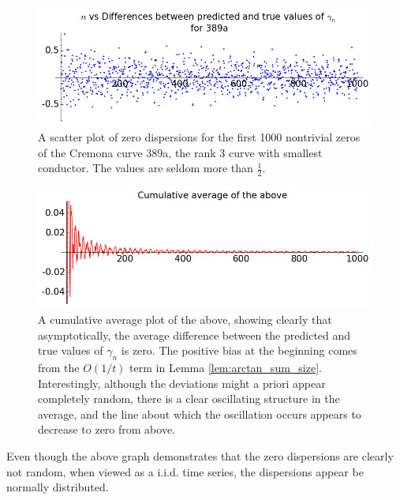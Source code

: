 \documentclass[10pt]{article}
\begin{document}
\begin{figure}[!h]
    \centering
    \includegraphics[width=1.0\textwidth]{graphics/389a_zero_dispersions_scatterplot.png}
    \caption{A scatter plot of zero dispersions for the first 1000 nontrivial zeros of the Cremona curve 389a, the rank 3 curve with smallest conductor. The values are seldom more than $\frac{1}{2}$.}
    \label{fig:389a_zero_dispersions_scatterplot}
\end{figure}

\begin{figure}[!h]
    \centering
    \includegraphics[width=1.0\textwidth]{graphics/389a_zero_dispersions_cumulative_average.png}
    \caption{A cumulative average plot of the above, showing clearly that asymptotically, the average difference between the predicted and true values of $\gamma_n$ is zero. The positive bias at the beginning comes from the $O(1/t)$ term in Lemma \ref{lem:arctan_sum_size}. Interestingly, although the deviations might a priori appear completely random, there is a clear oscillating structure in the average, and the line about which the oscillation occurs appears to decrease to zero from above.}
    \label{fig:zero_dispersions_cumulative_average}
\end{figure}

Even though the above graph demonstrates that the zero dispersions are clearly not random, when viewed as a i.i.d. time series, the dispersions appear be normally distributed. \\
\end{document}
